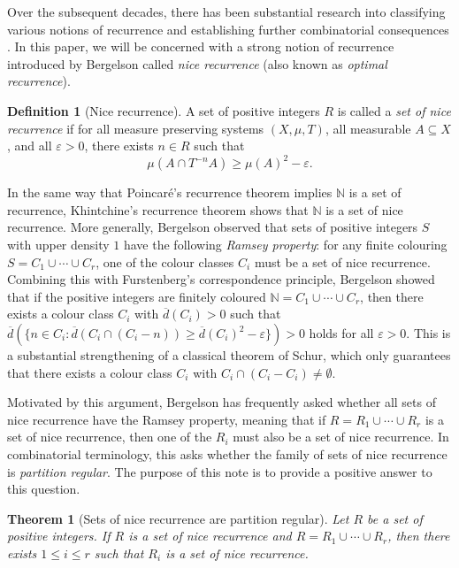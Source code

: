 \documentclass[reqno,a4paper,12pt]{amsart}
\newtheorem{theorem}{Theorem}
\theoremstyle{definition}
\newtheorem*{defn}{Definition}
\theoremstyle{remark}
\def \N {\mathbb{N}}
\def\eps{\varepsilon}
\begin{document}
Over the subsequent decades, there has been substantial research into classifying various notions of recurrence and establishing further combinatorial consequences \cite{KMF1978,Ber1986,For1990,McC1995,FLW2006,BL2008,Gri2019,Ack2022,DLMS2023,FS2025,Rod2025,Zel2026}. In this paper, we will be concerned with a strong notion of recurrence introduced by Bergelson \cite[Definition 2.2]{Ber1986} called \emph{nice recurrence} (also known as \emph{optimal recurrence}).
\begin{defn}[Nice recurrence]
    A set of positive integers $R$ is called a \emph{set of nice recurrence} if for all measure preserving systems $(X,\mu,T)$, all measurable $A\subseteq X$, and all $\eps>0$, there exists $n\in R$ such that
    \begin{equation*}
        \mu(A\cap T^{-n}A) \geqslant \mu(A)^2 - \eps.
    \end{equation*}
\end{defn}

In the same way that Poincar\'e's recurrence theorem implies $\N$ is a set of recurrence, Khintchine's recurrence theorem shows that $\N$ is a set of nice recurrence. More generally, Bergelson observed that sets of positive integers $S$ with upper density $1$ have the following \emph{Ramsey property}: for any finite colouring $S=C_1\cup\cdots\cup C_r$, one of the colour classes $C_i$ must be a set of nice recurrence. Combining this with Furstenberg's correspondence principle, Bergelson \cite[Theorem 1.1]{Ber1986} showed that if the positive integers are finitely coloured $\N=C_1\cup\cdots\cup C_r$, then there exists a colour class $C_i$ with $\overline{d}(C_i)>0$ such that $\overline{d}(\{n\in C_i:\overline{d}(C_i\cap (C_i -n)) \geqslant \overline{d}(C_i)^2 - \eps\}) > 0$ holds for all $\eps>0$. This is a substantial strengthening of a classical theorem of Schur, which only guarantees that there exists a colour class $C_i$ with $C_i\cap (C_i - C_i)\neq\emptyset$.

Motivated by this argument, Bergelson has frequently asked \cite{Ber1986,Ber1996,For1990,BL2008,Kra2024} whether all sets of nice recurrence have the Ramsey property, meaning that if $R=R_1\cup\cdots\cup R_r$ is a set of nice recurrence, then one of the $R_i$ must also be a set of nice recurrence. In combinatorial terminology, this asks whether the family of sets of nice recurrence is \emph{partition regular}. The purpose of this note is to provide a positive answer to this question.

\begin{theorem}[Sets of nice recurrence are partition regular]\label{thm1}
    Let $R$ be a set of positive integers. If $R$ is a set of nice recurrence and $R=R_1\cup\cdots \cup R_r$, then there exists $1\leqslant i\leqslant r$ such that $R_i$ is a set of nice recurrence.
\end{theorem} 
\end{document}
